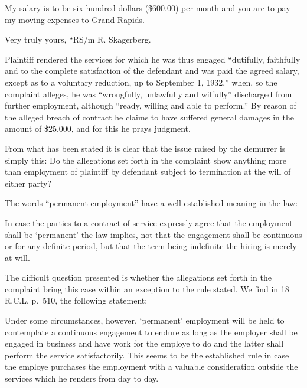 \documentclass[
  letterpaper,
  11pt,
  DIV=9,
  openright]{scrbook}
\renewenvironment{quote}{
  \list{}{\leftmargin=2em\rightmargin=2em}
  \item\relax\small
}
{\endlist}
\begin{document}
\begin{quote}
My salary is to be six hundred dollars (\$600.00) per month and you are
to pay my moving expenses to Grand Rapids.
\end{quote}

\begin{quote}
Very truly yours, ``RS/m R. Skagerberg.
\end{quote}

Plaintiff rendered the services for which he was thus engaged
``dutifully, faithfully and to the complete satisfaction of the
defendant and was paid the agreed salary, except as to a voluntary
reduction, up to September 1, 1932,'' when, so the complaint alleges, he
was ``wrongfully, unlawfully and wilfully'' discharged from further
employment, although ``ready, willing and able to perform.'' By reason
of the alleged breach of contract he claims to have suffered general
damages in the amount of \$25,000, and for this he prays judgment.

From what has been stated it is clear that the issue raised by the
demurrer is simply this: Do the allegations set forth in the complaint
show anything more than employment of plaintiff by defendant subject to
termination at the will of either party?

The words ``permanent employment'' have a well established meaning in
the law:

\begin{quote}
In case the parties to a contract of service expressly agree that the
employment shall be `permanent' the law implies, not that the engagement
shall be continuous or for any definite period, but that the term being
indefinite the hiring is merely at will.
\end{quote}

The difficult question presented is whether the allegations set forth in
the complaint bring this case within an exception to the rule stated. We
find in 18 R.C.L. p.~510, the following statement:

\begin{quote}
Under some circumstances, however, `permanent' employment will be held
to contemplate a continuous engagement to endure as long as the employer
shall be engaged in business and have work for the employe to do and the
latter shall perform the service satisfactorily. This seems to be the
established rule in case the employe purchases the employment with a
valuable consideration outside the services which he renders from day to
day.
\end{quote}
\end{document}

